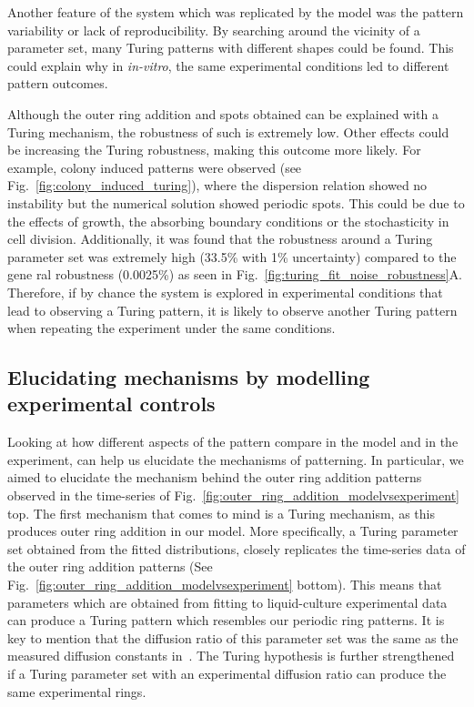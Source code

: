 Another feature of the system which was replicated by the model was the pattern variability or lack of reproducibility.
By searching around the vicinity of a parameter set, many Turing patterns with different shapes could be found.
This could explain why in \textit{in-vitro}, the same experimental conditions led to different pattern outcomes.

Although the outer ring addition and spots obtained can be explained with a Turing mechanism, the robustness of such is extremely low.
Other effects could be increasing the Turing robustness, making this outcome more likely.
For example, colony induced patterns were observed (see Fig.~\ref{fig:colony_induced_turing}), where the dispersion relation showed no instability but the numerical solution showed periodic spots.
This could be due to the effects of growth, the absorbing boundary conditions or the stochasticity in cell division.
Additionally, it was found that the robustness around a Turing parameter set was extremely high (33.5\% with 1\% uncertainty) compared to the gene ral robustness (0.0025\%) as seen in Fig.~\ref{fig:turing_fit_noise_robustness}A.
Therefore, if by chance the system is explored in experimental conditions that lead to observing a Turing pattern, it is likely to observe another Turing pattern when repeating the experiment under the same conditions.

\subsection{Elucidating mechanisms by modelling experimental controls}
Looking at how different aspects of the pattern compare in the model and in the experiment, can help us elucidate the mechanisms of patterning.
In particular, we aimed to elucidate the mechanism behind the outer ring addition patterns observed in the time-series of Fig.~\ref{fig:outer_ring_addition_modelvsexperiment} top.
The first mechanism that comes to mind is a Turing mechanism, as this produces outer ring addition in our model.
More specifically, a Turing parameter set obtained from the fitted distributions, closely replicates the time-series data of the outer ring addition patterns (See Fig.~\ref{fig:outer_ring_addition_modelvsexperiment} bottom).
This means that parameters which are obtained from fitting to liquid-culture experimental data can produce a Turing pattern which resembles our periodic ring patterns.
It is key to mention that the diffusion ratio of this parameter set was the same as the measured diffusion constants in~\cite{tica_diffusers}.
The Turing hypothesis is further strengthened if a Turing parameter set with an experimental diffusion ratio can produce the same experimental rings.

